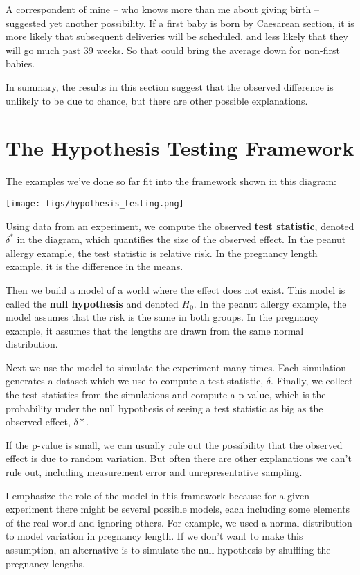 A correspondent of mine -- who knows more than me about giving birth --
suggested yet another possibility. If a first baby is born by Caesarean
section, it is more likely that subsequent deliveries will be scheduled,
and less likely that they will go much past 39 weeks. So that could
bring the average down for non-first babies.

In summary, the results in this section suggest that the observed
difference is unlikely to be due to chance, but there are other possible
explanations.

\section{The Hypothesis Testing
Framework}\label{the-hypothesis-testing-framework}

The examples we've done so far fit into the framework shown in this
diagram:

\texttt{[image: figs/hypothesis\_testing.png]}

Using data from an experiment, we compute the observed \textbf{test
statistic}, denoted \(\delta^*\) in the diagram, which quantifies the
size of the observed effect. In the peanut allergy example, the test
statistic is relative risk. In the pregnancy length example, it is the
difference in the means.

Then we build a model of a world where the effect does not exist. This
model is called the \textbf{null hypothesis} and denoted \(H_0\). In the
peanut allergy example, the model assumes that the risk is the same in
both groups. In the pregnancy example, it assumes that the lengths are
drawn from the same normal distribution.

Next we use the model to simulate the experiment many times. Each
simulation generates a dataset which we use to compute a test statistic,
\(\delta\). Finally, we collect the test statistics from the simulations
and compute a p-value, which is the probability under the null
hypothesis of seeing a test statistic as big as the observed effect,
\(\delta*\).

If the p-value is small, we can usually rule out the possibility that
the observed effect is due to random variation. But often there are
other explanations we can't rule out, including measurement error and
unrepresentative sampling.

I emphasize the role of the model in this framework because for a given
experiment there might be several possible models, each including some
elements of the real world and ignoring others. For example, we used a
normal distribution to model variation in pregnancy length. If we don't
want to make this assumption, an alternative is to simulate the null
hypothesis by shuffling the pregnancy lengths.

